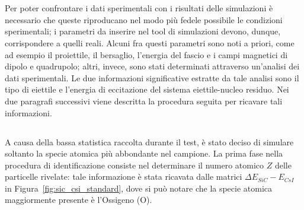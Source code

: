 \section{}

Per poter confrontare i dati sperimentali con i risultati delle simulazioni è necessario che queste riproducano nel modo più fedele possibile le condizioni sperimentali; i parametri da inserire nel tool di simulazioni devono, dunque, corrispondere a quelli reali.
Alcuni fra questi parametri sono noti a priori, come ad esempio il proiettile, il bersaglio, l'energia del fascio e i campi magnetici di dipolo e quadrupolo; altri, invece, sono stati determinati attraverso un'analisi dei dati sperimentali.
Le due informazioni significative estratte da tale analisi sono il tipo di eiettile e l'energia di eccitazione del sistema eiettile-nucleo residuo.
Nei due paragrafi successivi viene descritta la procedura seguita per ricavare tali informazioni.


\subsection{}

A causa della bassa statistica raccolta durante il test, è stato deciso di simulare soltanto la specie atomica più abbondante nel campione.
La prima fase nella procedura di identificazione consiste nel determinare il numero atomico $Z$ delle particelle rivelate: tale informazione è stata ricavata dalle matrici $\Delta E_{SiC} - E_{CsI}$ in Figura~\ref{fig:sic_csi_standard}, dove si può notare che la specie atomica maggiormente presente è l'Ossigeno (O). 


